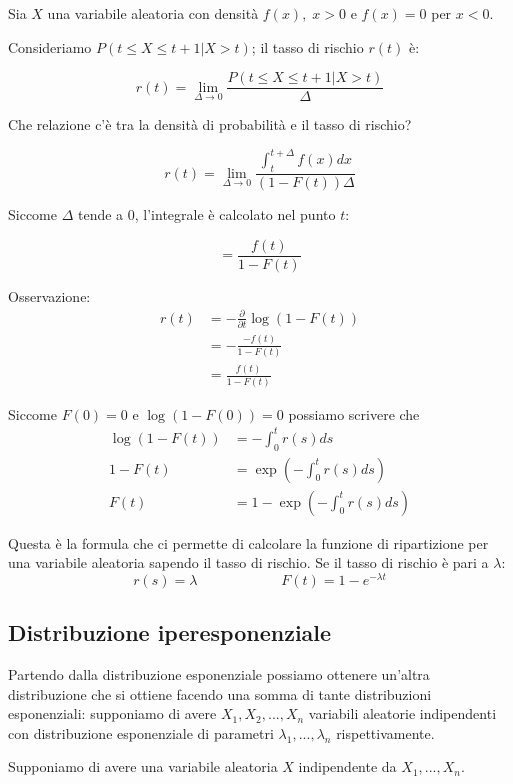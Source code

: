 \documentclass[a4paper,12pt]{book}
\begin{document}
Sia $ X $ una variabile aleatoria con densità $ f(x), \; x > 0 $ e $ f(x) = 0 $ per $ x < 0 $.

Consideriamo $ P(t \le X \le t+1 | X > t) $; il tasso di rischio $ r(t) $ è:

$$ r(t) = \lim\limits_{\Delta \to 0} \frac{P(t \le X \le t+1 | X > t)}{\Delta}$$ %

Che relazione c'è tra la densità di probabilità e il tasso di rischio?

$$ r(t) = \lim\limits_{\Delta \to 0} \frac{\int_{t}^{t + \Delta} f(x)dx }{(1 - F(t))\Delta}$$ 

Siccome $\Delta$ tende a 0, l'integrale è calcolato nel punto $ t $:

$$ = \frac{f(t)}{1 - F(t)} $$

Osservazione:
\begin{align*}
	r(t) & = -\frac{\partial}{\partial t} \log (1 - F(t)) \\
	& = - \frac{-f(t)}{1 - F(t)} \\
	& = \frac{f(t)}{1 - F(t)}
\end{align*}

Siccome $ F(0) = 0 $ e $ \log(1 - F(0)) = 0 $ possiamo scrivere che 
\begin{align*}
	\log(1 - F(t)) & = -\int_{0}^{t} r(s) ds \\
	1 - F(t) & = \exp \left( - \int_{0}^{t} r(s)ds \right) \\
	F(t) & = 1 - \exp \left( - \int_{0}^{t} r(s)ds \right)
\end{align*}

Questa è la formula che ci permette di calcolare la funzione di ripartizione per una variabile aleatoria sapendo il tasso di rischio. Se il tasso di rischio è pari a $\lambda$:
$$ r(s) = \lambda \qquad \qquad \qquad F(t) = 1 - e^{-\lambda t}$$ 

\subsection{Distribuzione iperesponenziale}

Partendo dalla distribuzione esponenziale possiamo ottenere un'altra distribuzione che si ottiene facendo una somma di tante distribuzioni esponenziali: supponiamo di avere $ X_1, X_2, ..., X_n $ variabili aleatorie indipendenti con distribuzione esponenziale di parametri $ \lambda_1, ..., \lambda_n $ rispettivamente. 

Supponiamo di avere una variabile aleatoria $ X $ indipendente da $ X_1, ..., X_n $.
\end{document}
